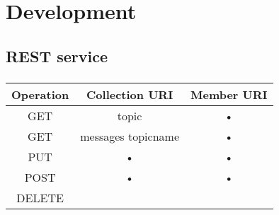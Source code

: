 \section{Development}

\subsection{REST service}

\subsubsection{}

\begin{tabular}{|c|c|c|}
\hline 
Operation & Collection URI & Member URI \\ 
\hline 
GET & topic & • \\ 
GET & messages topicname & • \\ 
\hline 
PUT & • & • \\ 
\hline 
POST & • & • \\ 
\hline
DELETE & & \\
\hline 
\end{tabular} 
